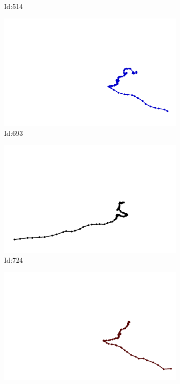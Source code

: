 \documentclass[12pt,twoside]{report}
\begin{document}
\begin{figure}
\begin{subfigure}[b]{0.20\textwidth}
\caption{Id:514}
\end{subfigure}
\begin{subfigure}[b]{0.20\textwidth}
\centering
\includegraphics[width=\textwidth]{../../trajectories/693.png}
\caption{Id:693}
\end{subfigure}
\begin{subfigure}[b]{0.20\textwidth}
\centering
\includegraphics[width=\textwidth]{../../trajectories/724.png}
\caption{Id:724}
\end{subfigure}
\begin{subfigure}[b]{0.20\textwidth}
\centering
\includegraphics[width=\textwidth]{../../trajectories/729.png}

\end{subfigure}
\end{figure}
\end{document}
